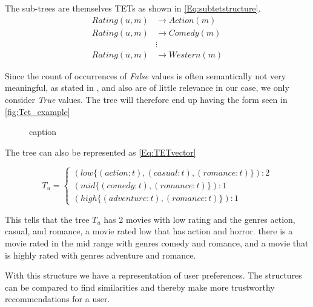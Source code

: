 The sub-trees are themselves TETs as shown in \autoref{Eq:subtetstructure}.
\begin{equation}\label{Eq:subtetstructure}
\begin{aligned}
Rating(u,m)& \longrightarrow Action(m) \\
Rating(u,m)& \longrightarrow Comedy(m)\\
& \vdots \\
Rating(u,m)& \longrightarrow Western(m)
\end{aligned}
\end{equation}

Since the count of occurrences of \textit{False} values is often semantically not very meaningful, as stated in \cite{jaeger2019counts}, and also are of little relevance in our case, we only consider \textit{True} values. The tree will therefore end up having the form seen in \autoref{fig:Tet_example}

\begin{figure}[H]
    \centering
    \begin{adjustbox}{width=0.5\textwidth}
    
    \end{adjustbox}
    \caption{caption}
    \label{fig:Tet_example}
\end{figure}


The tree can also be represented as \autoref{Eq:TETvector}

\begin{equation}\label{Eq:TETvector}
    T_u=
    \begin{cases}
      (low \{(action:t),(casual:t), (romance:t)\}):2 \\
      (mid \{(comedy:t),(romance:t)\}):1 \\
      (high\{(adventure:t),(romance:t)\}):1
    \end{cases}
\end{equation}

This tells that the tree $T_u$ has 2 movies with low rating and the genres action, casual, and romance, a movie rated low that has action and horror. there is a movie rated in the mid range with genres comedy and romance, and a movie that is highly rated with genres adventure and romance.

With this structure we have a representation of user preferences.
The structures can be compared to find similarities and thereby make more trustworthy recommendations for a user.
